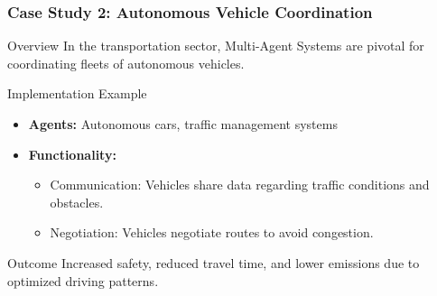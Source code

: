 \documentclass[aspectratio=169]{beamer}
\begin{document}
\begin{frame}[fragile]
    \frametitle{Case Study 2: Autonomous Vehicle Coordination}
    
    \begin{block}{Overview}
        In the transportation sector, Multi-Agent Systems are pivotal for coordinating fleets of autonomous vehicles.
    \end{block}

    \begin{block}{Implementation Example}
        \begin{itemize}
            \item \textbf{Agents:} Autonomous cars, traffic management systems
            \item \textbf{Functionality:}
                \begin{itemize}
                    \item Communication: Vehicles share data regarding traffic conditions and obstacles.
                    \item Negotiation: Vehicles negotiate routes to avoid congestion.
                \end{itemize}
        \end{itemize}
    \end{block}

    \begin{block}{Outcome}
        Increased safety, reduced travel time, and lower emissions due to optimized driving patterns.
    \end{block}
\end{frame}
\end{document}

